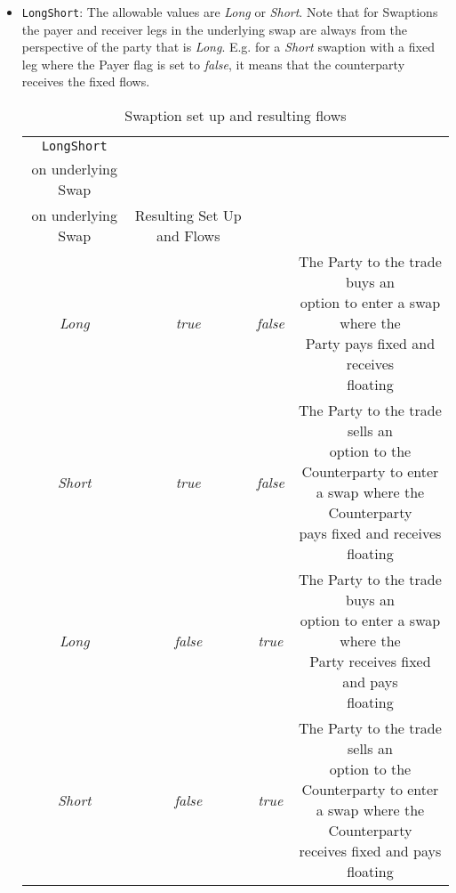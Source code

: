 \begin{itemize}
\item \lstinline!LongShort!: The allowable values are \emph{Long} or \emph{Short}. Note that for Swaptions the payer and receiver legs in the underlying swap are always from the perspective of the party that is \emph{Long}. E.g. for a \emph{Short} swaption with a fixed leg where the Payer flag is set to \emph{false}, it means that the counterparty receives the fixed flows.  

\begin{table}[H]
\centering
\begin{tabular} {| c | c | c | c |}    \hline
        \lstinline!LongShort! & \makecell{\lstinline!Payer! for Fixed leg \\ on underlying Swap} & \makecell{\lstinline!Payer! for Floating leg \\ on underlying Swap} & Resulting Set Up and Flows \\  \hline
   \emph{Long} & \emph{true} & \emph{false} & \makecell[l]{The Party to the trade buys an \\ option to enter a swap where the \\ Party pays fixed and receives \\ floating}  \\  \hline
    \emph{Short} & \emph{true} & \emph{false} & \makecell[l]{The Party to the trade sells an \\ option to the Counterparty to enter \\ a swap where the Counterparty \\ pays fixed and receives floating}  \\  \hline
    \emph{Long} & \emph{false} & \emph{true} & \makecell[l]{The Party to the trade buys an \\ option to enter a swap where the \\ Party receives fixed and pays \\ floating}  \\  \hline
    \emph{Short} & \emph{false} & \emph{true} & \makecell[l]{The Party to the trade sells an \\ option to the Counterparty to enter \\ a swap where the Counterparty \\ receives fixed and pays floating}  \\  \hline        
  \end{tabular}
  \caption{Swaption set up and resulting flows}
  \label{tab:swaption_setup}
\end{table}


\end{itemize}
